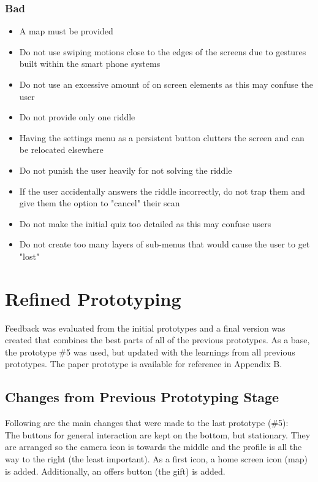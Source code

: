 \documentclass[10pt,twocolumn]{article} %
\begin{document}
\subsubsection*{Bad}
\begin{itemize}[noitemsep]
  \item A map must be provided
  \item Do not use swiping motions close to the edges of the screens due to gestures built within the smart phone systems
  \item Do not use an excessive amount of on screen elements as this may confuse the user
  \item Do not provide only one riddle
  \item Having the settings menu as a persistent button clutters the screen and can be relocated elsewhere
  \item Do not punish the user heavily for not solving the riddle
  \item If the user accidentally answers the riddle incorrectly, do not trap them and give them the option to "cancel" their scan
  \item Do not make the initial quiz too detailed as this may confuse users
  \item Do not create too many layers of sub-menus that would cause the user to get "lost"
\end{itemize}

\section*{Refined Prototyping}

Feedback was evaluated from the initial prototypes and a final version was created that combines the best parts of all of the previous prototypes.
As a base, the prototype \#5 was used, but updated with the learnings from all previous prototypes. The paper prototype is available for reference in Appendix B.

\subsection*{Changes from Previous Prototyping Stage}
Following are the main changes that were made to the last prototype (\#5): \\

The buttons for general interaction are kept on the bottom, but stationary. They are arranged so the camera icon is towards the middle and the profile is all the way to the right (the least important). As a first icon, a home screen icon (map) is added. Additionally, an offers button (the gift) is added. \\
\end{document}
